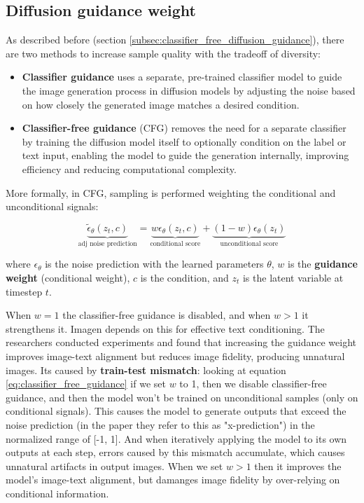 \subsection{Diffusion guidance weight}
\label{subsec:imagen_diffusion_guidance_weight}

As described before (section \ref{subsec:classifier_free_diffusion_guidance}), there are two methods to increase sample quality with the tradeoff of diversity:

\begin{itemize}
    \item \textbf{Classifier guidance} uses a separate, pre-trained classifier model to guide the image generation process in diffusion models by adjusting the noise based on how closely the generated image matches a desired condition.
    
    \item \textbf{Classifier-free guidance} (CFG) removes the need for a separate classifier by training the diffusion model itself to optionally condition on the label or text input, enabling the model to guide the generation internally, improving efficiency and reducing computational complexity.
\end{itemize}

More formally, in CFG, sampling is performed weighting the conditional and unconditional signals:

\begin{equation}
    \underbrace{\tilde{\epsilon}_\theta (z_t, c)}_{\text{adj noise prediction}} = \underbrace{w \epsilon_\theta (z_t, c)}_{\text{conditional score}} + \underbrace{(1 - w) \epsilon_\theta (z_t)}_{\text{unconditional score}}
    \label{eq:classifier_free_guidance}
\end{equation}

where $\epsilon_\theta$ is the noise prediction with the learned parameters $\theta$, $w$ is the \textbf{guidance weight} (conditional weight), $c$ is the condition, and $z_t$ is the latent variable at timestep $t$.

When $w=1$ the classifier-free guidance is disabled, and when $w>1$ it strengthens it. Imagen depends on this for effective text conditioning. The researchers conducted experiments and found that increasing the guidance weight improves image-text alignment but reduces image fidelity, producing unnatural images. Its caused by \textbf{train-test mismatch}: looking at equation \ref{eq:classifier_free_guidance} if we set $w$ to 1, then we disable classifier-free guidance, and then the model won't be trained on unconditional samples (only on conditional signals). This causes the model to generate outputs that exceed the noise prediction (in the paper they refer to this as "x-prediction") in the normalized range of [-1, 1]. And when iteratively applying the model to its own outputs at each step, errors caused by this mismatch accumulate, which causes unnatural artifacts in output images. When we set $w>1$ then it improves the model's image-text alignment, but damanges image fidelity by over-relying on conditional information.

